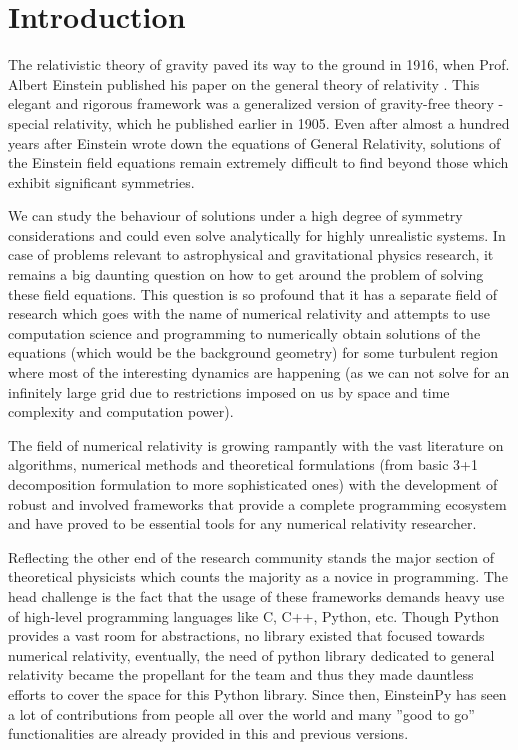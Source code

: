\documentclass[onecolumn]{aa}
\begin{document}
   \maketitle
%

\section{Introduction}

   The relativistic theory of gravity paved its way to the ground in 1916, 
   when Prof. Albert Einstein published his paper on the general theory of 
   relativity \citeyear{Einstein:1916vd}. This elegant and rigorous framework 
   was a generalized version of gravity-free theory - special relativity, 
   which he published earlier in 1905. Even after almost a hundred years 
   after Einstein wrote down the equations of General Relativity, solutions 
   of the Einstein field equations remain extremely difficult to find beyond 
   those which exhibit significant symmetries.

   We can study the behaviour of solutions under a high degree of symmetry 
   considerations and could even solve analytically for highly unrealistic 
   systems. In case of problems relevant to astrophysical and gravitational 
   physics research, it remains a big daunting question on how to get around 
   the problem of solving these field equations. This question is so profound 
   that it has a separate field of research which goes with the name of numerical  
   relativity and attempts to use computation science and programming to numerically 
   obtain solutions of the equations (which would be the background geometry) 
   for some turbulent region where most of the interesting dynamics are happening 
   (as we can not solve for an infinitely large grid due to restrictions imposed 
   on us by space and time complexity and computation power). 

   The field of numerical relativity is growing rampantly with the vast literature 
   on algorithms, numerical methods and theoretical formulations (from basic 3+1 
   decomposition formulation to more sophisticated ones) with the development of 
   robust and involved frameworks that provide a complete programming ecosystem 
   and have proved to be essential tools for any numerical relativity researcher.
   
   Reflecting the other end of the research community stands the major section 
   of theoretical physicists which counts the majority as a novice in programming. 
   The head challenge is the fact that the usage of these frameworks demands 
   heavy use of high-level programming languages like C, C++, Python, etc. 
   Though Python provides a vast room for abstractions, no library existed that  
   focused towards numerical relativity, eventually, the need of python library  
   dedicated to general relativity became the propellant for the team and thus 
   they made dauntless efforts to cover the space for this Python library. 
   Since then, EinsteinPy has seen a lot of contributions from people all over 
   the world and many ”good to go” functionalities are already provided in 
   this and previous versions.
   
\end{document}
